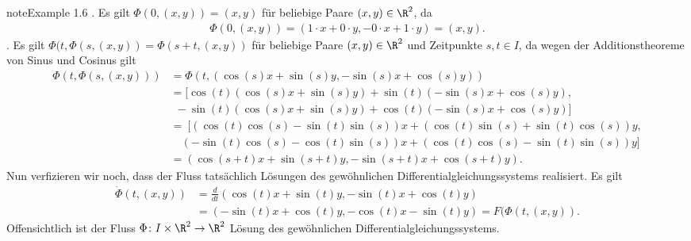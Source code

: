 \documentclass[letterpaper,10pt,english]{jupyterBook}
\begin{document}
\begin{sphinxadmonition}{note}{Example 1.6}
. Es gilt \(\Phi(0, (x,y)) = (x,y)\) für beliebige Paare \((x,y) \in \R^2\), da
\begin{equation*}
\begin{split}\Phi(0, (x,y)) = (1\cdot x + 0\cdot y, - 0 \cdot x + 1 \cdot y) = (x,y).\end{split}
\end{equation*}
. Es gilt \(\Phi(t, \Phi(s,(x,y)) = \Phi(s + t, (x,y))\) für beliebige Paare \((x,y) \in \R^2\) und Zeitpunkte \(s,t \in I\), da wegen der Additionstheoreme von Sinus und Cosinus gilt
\begin{equation*}
\begin{split}\Phi(t, \Phi(s,(x,y))) &= \Phi(t, (\cos(s)x + \sin(s)y, -\sin(s)x + \cos(s)y)) \\
&= [\cos(t)(\cos(s)x + \sin(s)y) + \sin(t)(-\sin(s)x + \cos(s)y), \\
& \ \ -\sin(t)(\cos(s)x + \sin(s)y) + \cos(t)(-\sin(s)x + \cos(s)y)]\\
&= \ [ (\cos(t)\cos(s) - \sin(t)\sin(s))x + (\cos(t)\sin(s) + \sin(t)\cos(s))y, \\
& \quad (-\sin(t)\cos(s) - \cos(t)\sin(s))x + (\cos(t)\cos(s) - \sin(t)\sin(s))y ] \\
&= (\cos(s+t)x + \sin(s+t)y, -\sin(s+t)x + \cos(s+t)y).\end{split}
\end{equation*}
\sphinxAtStartPar
Nun verfizieren wir noch, dass der Fluss tatsächlich Lösungen des gewöhnlichen Differentialgleichungssystems realisiert.
Es gilt
\begin{equation*}
\begin{split}\dot{\Phi}(t, (x,y)) &= \frac{d}{dt}(\cos(t)x + \sin(t)y, -\sin(t)x + \cos(t)y) \\
&= (-\sin(t)x + \cos(t)y, -\cos(t)x - \sin(t)y) = F(\Phi(t,(x,y)).\end{split}
\end{equation*}
\sphinxAtStartPar
Offensichtlich ist der Fluss \(\Phi \colon I \times \R^2 \rightarrow \R^2\) Lösung des gewöhnlichen Differentialgleichungssystems.
\end{sphinxadmonition}
\end{document}
